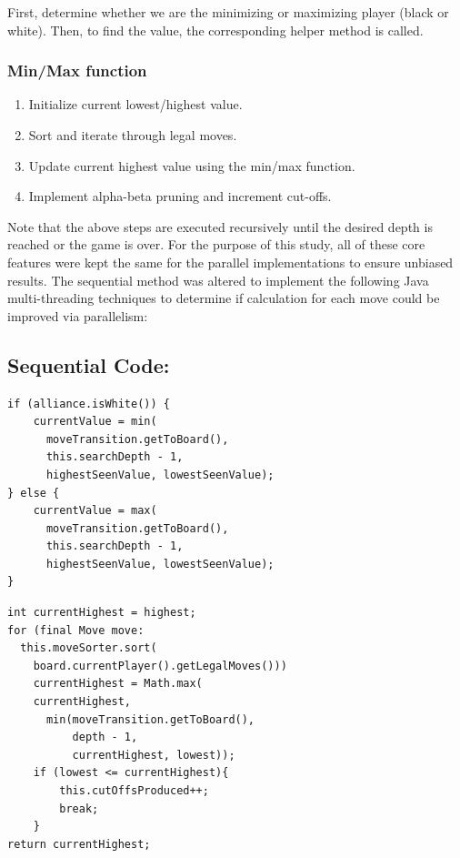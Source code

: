 \documentclass[conference, 11pt]{IEEEtran}
\begin{document}
First, determine whether we are the minimizing or maximizing player (black or white). Then, to find the value, the corresponding helper method is called.

\subsubsection*{Min/Max function}

\begin{enumerate}
\item Initialize current lowest/highest value.
\item Sort and iterate through legal moves.
\item Update current highest value using the min/max function.
\item Implement alpha-beta pruning and increment cut-offs.
\end{enumerate}

Note that the above steps are executed recursively until the desired depth is reached or the game is over.
For the purpose of this study, all of these core features were kept the same for the parallel implementations to ensure unbiased results.
The sequential method was altered to implement the following Java multi-threading techniques to determine if calculation for each move could be improved via parallelism:\\
\subsection{Sequential Code:}
\lstset{basicstyle=\small}
\begin{lstlisting}
if (alliance.isWhite()) {
    currentValue = min(
      moveTransition.getToBoard(),
      this.searchDepth - 1,
      highestSeenValue, lowestSeenValue);
} else {
    currentValue = max(
      moveTransition.getToBoard(),
      this.searchDepth - 1,
      highestSeenValue, lowestSeenValue);
}
\end{lstlisting}

\lstset{basicstyle=\small}
\begin{lstlisting}
int currentHighest = highest;
for (final Move move:
  this.moveSorter.sort(
    board.currentPlayer().getLegalMoves())) 
    currentHighest = Math.max(
    currentHighest,
      min(moveTransition.getToBoard(),
          depth - 1,
          currentHighest, lowest));
    if (lowest <= currentHighest){
        this.cutOffsProduced++;
        break;
    }
return currentHighest;
\end{lstlisting}
\end{document}
